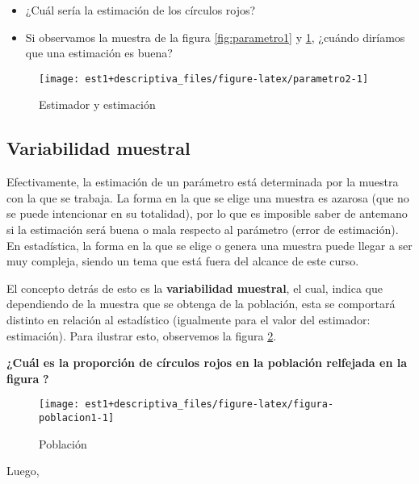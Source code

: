 \documentclass[
]{book}
\providecommand{\tightlist}{%
  \setlength{\itemsep}{0pt}\setlength{\parskip}{0pt}}
\begin{document}
\begin{itemize}
\tightlist
\item
  ¿Cuál sería la estimación de los círculos rojos?
\item
  Si observamos la muestra de la figura \ref{fig:parametro1} y \ref{fig:parametro2}, ¿cuándo diríamos que una estimación es buena?
\end{itemize}

\begin{figure}

{\centering \texttt{[image: est1+descriptiva\_files/figure-latex/parametro2-1]} 

}

\caption{Estimador y estimación}\label{fig:parametro2}
\end{figure}

\hypertarget{variabilidad-muestral}{%
\subsection{Variabilidad muestral}\label{variabilidad-muestral}}

Efectivamente, la estimación de un parámetro está determinada por la muestra con la que se trabaja. La forma en la que se elige una muestra es azarosa (que no se puede intencionar en su totalidad), por lo que es imposible saber de antemano si la estimación será buena o mala respecto al parámetro (error de estimación). En estadística, la forma en la que se elige o genera una muestra puede llegar a ser muy compleja, siendo un tema que está fuera del alcance de este curso.

El concepto detrás de esto es la \textbf{variabilidad muestral}, el cual, indica que dependiendo de la muestra que se obtenga de la población, esta se comportará distinto en relación al estadístico (igualmente para el valor del estimador: estimación). Para ilustrar esto, observemos la figura \ref{fig:figura-poblacion1}.

\textbf{¿Cuál es la proporción de círculos rojos en la población relfejada en la figura} \textbf{?}

\begin{figure}

{\centering \texttt{[image: est1+descriptiva\_files/figure-latex/figura-poblacion1-1]} 

}

\caption{Población}\label{fig:figura-poblacion1}
\end{figure}

Luego,
\end{document}
